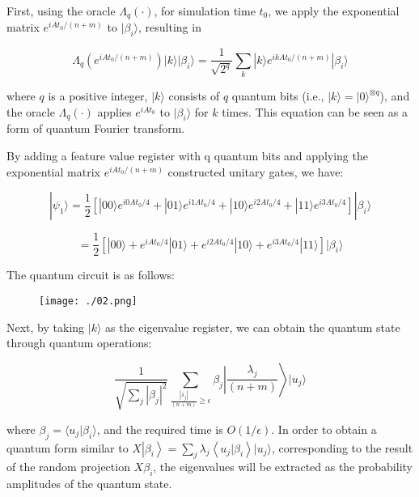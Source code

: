 \documentclass[12pt]{article}
\begin{document}
First, using the oracle $\Lambda_{q}(\cdot)$, for simulation time $t_{0}$, we apply the exponential matrix $e^{i A t_{0} /(n+m)}$ to $|\beta_{i}\rangle$, resulting in

$$
\Lambda_{q}\left(e^{i A t_{0} /(n+m)}\right)|k\rangle|\beta_{i}\rangle=\frac{1}{\sqrt{2^{q}}} \sum_{k}|k\rangle e^{i k A t_{0} /(n+m)}|\beta_{i}\rangle
$$

where $q$ is a positive integer, $|k\rangle$ consists of $q$ quantum bits (i.e., $|k\rangle=|0\rangle^{\otimes q}$), and the oracle $\Lambda_{q}(\cdot)$ applies $e^{i A t_{0}}$ to $|\beta_{i}\rangle$ for $k$ times. This equation can be seen as a form of quantum Fourier transform.

By adding a feature value register with q quantum bits and applying the exponential matrix $e^{i A t_{0} /(n+m)}$ constructed unitary gates, we have:




$$
|\psi_1\rangle=\frac{1}{2} \left[|00\rangle e^{i 0 A t_{0} /4} + |01\rangle e^{i 1 A t_{0} /4} + |10\rangle e^{i 2 A t_{0} /4} + |11\rangle e^{i 3 A t_{0} /4}\right] |\beta_{i}\rangle
$$

$$
=\frac{1}{2} \left[|00\rangle + e^{i A t_{0} /4} |01\rangle + e^{i 2 A t_{0} /4} |10\rangle + e^{i 3 A t_{0} /4} |11\rangle\right] |\beta_{i}\rangle
$$

The quantum circuit is as follows:

\begin{figure}[ht]
\begin{center}
\texttt{[image: ./02.png]} 
\end{center}
\end{figure}

Next, by taking $|k\rangle$ as the eigenvalue register, we can obtain the quantum state through quantum operations:

$$
\frac{1}{\sqrt{\sum_{j}|\beta_{j}|^{2}}} \sum_{\frac{|\lambda_{j}|}{(n+m)} \geq \epsilon} \beta_{j}\left|\frac{\lambda_{j}}{(n+m)}\right\rangle|u_{j}\rangle
$$

where $\beta_{j}=\langle u_{j}|\beta_{i}\rangle$, and the required time is $O(1 / \epsilon)$. In order to obtain a quantum form similar to $X\left|\beta_{i}\right\rangle=\sum_{j} \lambda_{j}\left\langle u_{j}|\beta_{i}\right\rangle|u_{j}\rangle$, corresponding to the result of the random projection $X\beta_{i}$, the eigenvalues will be extracted as the probability amplitudes of the quantum state.
\end{document}
